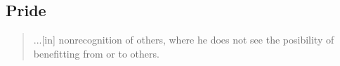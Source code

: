 \documentclass[letterpaper]{article}
\begin{document}





\subsection{Pride}
\begin{quote}
  ...[in] nonrecognition of others, where he does not see the posibility of benefitting from or to others.
\end{quote}
\end{document}
